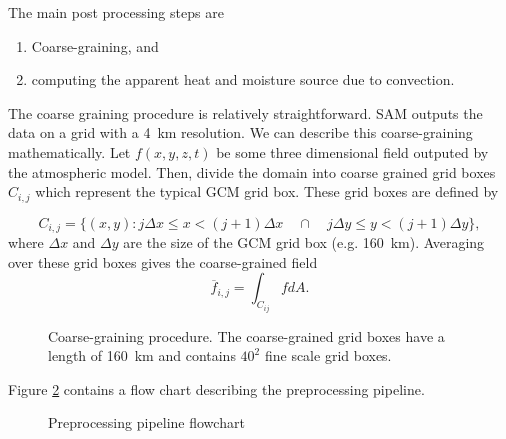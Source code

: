 \documentclass{report}
\newcommand{\1}[1]{\mathds{1}\left[#1\right]}
\begin{document}
The main post processing steps are

\begin{enumerate}
\item Coarse-graining, and 
\item computing the apparent heat and moisture source due to convection.
\end{enumerate}

The coarse graining procedure is relatively straightforward. 
SAM outputs the data on a grid with a \SI{4}{\km} resolution. 
We can describe this coarse-graining mathematically. 
Let $f(x,y,z,t)$ be some three dimensional field outputed by the atmospheric
model. 
Then, divide the domain into coarse grained grid boxes $C_{i,j}$ which represent the
typical GCM grid box. These grid boxes are defined by

\[
  C_{i,j} = \{(x,y):   j \Delta x \leq x < (j+1) \Delta x
  \quad \cap\quad j \Delta y \leq y < (j+1) \Delta y \},
\]
where $\Delta x$ and $\Delta y$ are the size of the GCM grid box (e.g.
\SI{160}{\km}). Averaging over these grid boxes gives the coarse-grained field
\[
  \overline{f}_{i,j} = \int_{C_{ij}} f dA.
\]

\begin{figure}
  \centering
  \caption{Coarse-graining procedure. The coarse-grained grid boxes have a
    length of \SI{160}{km} and contains $40^2$ fine scale grid boxes.}
  \label{fig:coarse-grain}
\end{figure}

Figure \ref{fig:preprocess} contains a flow chart describing the preprocessing pipeline.

\begin{figure}
  \centering
  
  \caption{Preprocessing pipeline flowchart}
  \label{fig:preprocess}
\end{figure}
\end{document}
